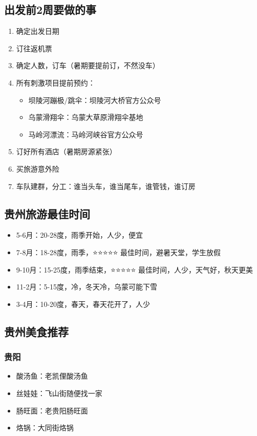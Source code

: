 \documentclass[12pt,a4paper,UTF8]{ctexart}
\begin{document}
\subsection{出发前2周要做的事}
\begin{enumerate}
\item 确定出发日期
\item 订往返机票
\item 确定人数，订车（暑期要提前订，不然没车）
\item 所有刺激项目提前预约：
  \begin{itemize}
  \item 坝陵河蹦极/跳伞：坝陵河大桥官方公众号
  \item 乌蒙滑翔伞：乌蒙大草原滑翔伞基地
  \item 马岭河漂流：马岭河峡谷官方公众号
  \end{itemize}
\item 订好所有酒店（暑期房源紧张）
\item 买旅游意外险
\item 车队建群，分工：谁当头车，谁当尾车，谁管钱，谁订房
\end{enumerate}

\subsection{贵州旅游最佳时间}
\begin{itemize}
\item 5-6月：20-28度，雨季开始，人少，便宜
\item 7-8月：18-28度，雨季，⭐⭐⭐⭐⭐ 最佳时间，避暑天堂，学生放假
\item 9-10月：15-25度，雨季结束，⭐⭐⭐⭐⭐ 最佳时间，人少，天气好，秋天更美
\item 11-2月：5-15度，冷，冬天冷，乌蒙可能下雪
\item 3-4月：10-20度，春天，春天花开了，人少
\end{itemize}

\subsection{贵州美食推荐}

\subsubsection{贵阳}
\begin{itemize}
\item 酸汤鱼：老凯俚酸汤鱼
\item 丝娃娃：飞山街随便找一家
\item 肠旺面：老贵阳肠旺面
\item 烙锅：大同街烙锅
\end{itemize}
\end{document}
